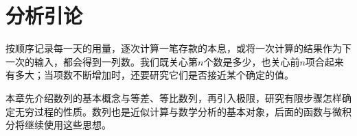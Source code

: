 \chapter{分析引论}

按顺序记录每一天的用量，逐次计算一笔存款的本息，或将一次计算的结果作为下一次的输入，都会得到一列数。我们既关心第\(n\)个数是多少，也关心前\(n\)项合起来有多大；当项数不断增加时，还要研究它们是否接近某个确定的值。

本章先介绍数列的基本概念与等差、等比数列，再引入极限，研究有限步骤怎样确定无穷过程的性质。数列也是近似计算与数学分析的基本对象，后面的函数与微积分将继续使用这些思想。










